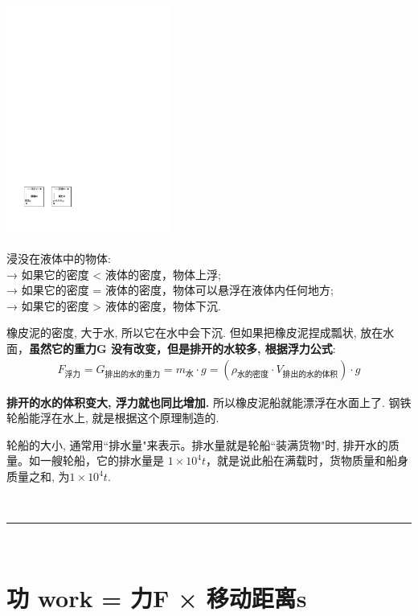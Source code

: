 \documentclass[UTF8]{ctexart}
\begin{document}
\includegraphics[width=0.4\textwidth]{img/0044.pdf}

浸没在液体中的物体: \\
→ 如果它的密度 < 液体的密度，物体上浮;  \\
→ 如果它的密度 = 液体的密度，物体可以悬浮在液体内任何地方; \\
→ 如果它的密度 > 液体的密度，物体下沉. \\

\begin{tcolorbox}[title = {例},boxrule={0.1em},colframe={black!10}, colback={black!3},colbacktitle={black!10},coltitle={black}]
橡皮泥的密度, 大于水, 所以它在水中会下沉. 但如果把橡皮泥捏成瓢状, 放在水面，\textbf{虽然它的重力G 没有改变，但是排开的水较多, 根据浮力公式}:  	
\begin{align*}
	\boxed{	
	F_{\text{浮力}}=G_{\text{排出的水的重力}}=m_{\text{水}}\cdot g=\left( \rho _{\text{水的密度}}\cdot V_{\text{排出的水的体积}} \right) \cdot g
	}
\end{align*}

\textbf{排开的水的体积变大, 浮力就也同比增加.} 所以橡皮泥船就能漂浮在水面上了. 钢铁轮船能浮在水上, 就是根据这个原理制造的. 
\end{tcolorbox}

轮船的大小, 通常用``排水量"来表示。排水量就是轮船``装满货物"时, 排开水的质量。如一艘轮船，它的排水量是 $1×10^4 t$，就是说此船在满载时，货物质量和船身质量之和, 为$1×10^4 t$.



~\\
\hrule
~\\

\section{功 work = 力F × 移动距离s}
\end{document}
